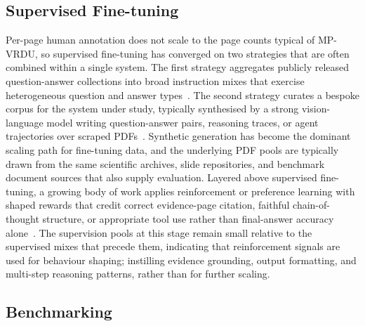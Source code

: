 \documentclass[11pt]{article}
\begin{document}
\subsection{Supervised Fine-tuning}
\label{app:dataset-sft}
Per-page human annotation does not scale to the page counts typical of MP-VRDU, so supervised fine-tuning has converged on two strategies that are often combined within a single system. The first strategy aggregates publicly released question-answer collections into broad instruction mixes that exercise heterogeneous question and answer types~\cite{tanaka2024instructdoc,jia2024leopard,hu2025mplug2,duan2025docopilot,ding2025synjac}. The second strategy curates a bespoke corpus for the system under study, typically synthesised by a strong vision-language model writing question-answer pairs, reasoning traces, or agent trajectories over scraped PDFs~\cite{xie2024wukong,tanaka2025vdocrag,wu2025molorag,zhang2026docdancer,guo2026end}. Synthetic generation has become the dominant scaling path for fine-tuning data, and the underlying PDF pools are typically drawn from the same scientific archives, slide repositories, and benchmark document sources that also supply evaluation. Layered above supervised fine-tuning, a growing body of work applies reinforcement or preference learning with shaped rewards that credit correct evidence-page citation, faithful chain-of-thought structure, or appropriate tool use rather than final-answer accuracy alone~\cite{xiong2026docr1,guo2026end,yan2025docseeker,lin2026mmdocr1,xu2026mmr5,wang2026vragrl}. The supervision pools at this stage remain small relative to the supervised mixes that precede them, indicating that reinforcement signals are used for behaviour shaping; instilling evidence grounding, output formatting, and multi-step reasoning patterns, rather than for further scaling.

\subsection{Benchmarking}
\label{app:dataset-bm}
\end{document}
